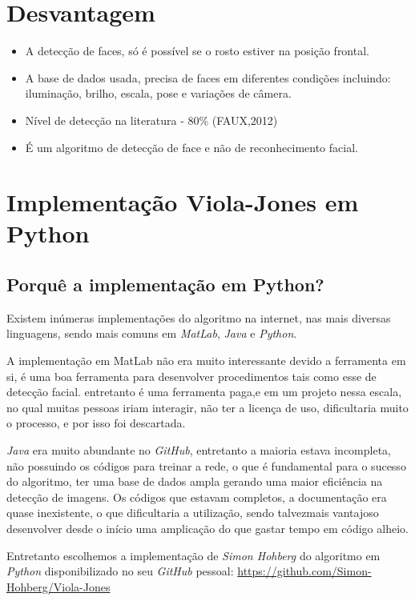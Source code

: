 \documentclass[12pt,a4paper]{article}
\begin{document}
\section{Desvantagem}
\begin{itemize}
	\item A detecção de faces, só é possível se o rosto estiver na posição frontal.
	\item A base de dados usada, precisa de faces em diferentes condições incluindo: iluminação, brilho, escala, pose e variações de câmera.
	\item Nível de detecção na literatura - 80\% (FAUX,2012)
	\item É um algoritmo de detecção de face e não de reconhecimento facial.
\end{itemize}

\section{Implementação Viola-Jones em Python}

\subsection{Porquê a implementação em Python?}
Existem inúmeras implementações do algoritmo na internet, nas mais diversas linguagens, sendo mais comuns em \textit{MatLab}, \textit{Java} e \textit{Python}. 

A implementação em MatLab não era muito interessante devido a ferramenta em si, é uma boa ferramenta para desenvolver procedimentos tais como esse de detecção facial. entretanto é uma ferramenta paga,e  em um projeto nessa escala, no qual muitas pessoas iriam interagir, não ter a licença de uso, dificultaria muito o processo, e por isso foi descartada.

\textit{Java} era muito abundante no \textit{GitHub}, entretanto a maioria estava incompleta, não possuindo os códigos para treinar a rede, o que é fundamental para o sucesso do algoritmo, ter uma base de dados ampla gerando uma maior eficiência na detecção de imagens. Os códigos que estavam completos, a documentação era quase inexistente, o que dificultaria a utilização, sendo talvezmais vantajoso desenvolver desde o início uma amplicação do que gastar tempo em código alheio. 


Entretanto escolhemos a implementação de \textit{Simon Hohberg} do algoritmo em \textit{Python} disponibilizado no seu \textit{GitHub} pessoal:
\url{https://github.com/Simon-Hohberg/Viola-Jones}
\end{document}
